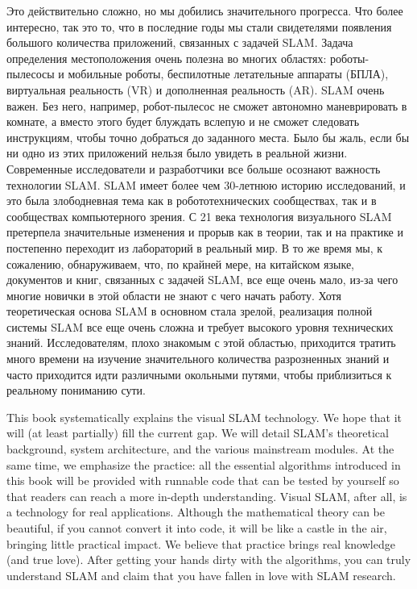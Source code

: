 \begin{Russian}
    Это действительно сложно, но мы добились значительного прогресса. Что более интересно, так это то, что в последние годы мы стали свидетелями появления большого количества приложений, связанных с задачей SLAM. Задача определения местоположения очень полезна во многих областях: роботы-пылесосы и мобильные роботы, беспилотные летательные аппараты (БПЛА), виртуальная реальность (VR) и дополненная реальность (AR). SLAM очень важен. Без него, например, робот-пылесос не сможет автономно маневрировать в комнате, а вместо этого будет блуждать вслепую и не сможет следовать инструкциям, чтобы точно добраться до заданного места. Было бы жаль, если бы ни одно из этих приложений нельзя было увидеть в реальной жизни.
    Современные исследователи и разработчики все больше осознают важность технологии SLAM. SLAM имеет более чем 30-летнюю историю исследований, и это была злободневная тема как в робототехнических сообществах, так и в сообществах компьютерного зрения. С 21 века технология визуального SLAM претерпела значительные изменения и прорыв как в теории, так и на практике и постепенно переходит из лабораторий в реальный мир. В то же время мы, к сожалению, обнаруживаем, что, по крайней мере, на китайском языке, документов и книг, связанных с задачей SLAM, все еще очень мало, из-за чего многие новички в этой области не знают с чего начать работу. Хотя теоретическая основа SLAM в основном стала зрелой, реализация полной системы SLAM все еще очень сложна и требует высокого уровня технических знаний. Исследователям, плохо знакомым с этой областью, приходится тратить много времени на изучение значительного количества разрозненных знаний и часто приходится идти различными окольными путями, чтобы приблизиться к реальному пониманию сути.    
\end{Russian}

\begin{English}
    This book systematically explains the visual SLAM technology. We hope that it will (at least partially) fill the current gap. We will detail SLAM's theoretical background, system architecture, and the various mainstream modules. At the same time, we emphasize the practice: all the essential algorithms introduced in this book will be provided with runnable code that can be tested by yourself so that readers can reach a more in-depth understanding. Visual SLAM, after all, is a technology for real applications. Although the mathematical theory can be beautiful, if you cannot convert it into code, it will be like a castle in the air, bringing little practical impact. We believe that practice brings real knowledge (and true love). After getting your hands dirty with the algorithms, you can truly understand SLAM and claim that you have fallen in love with SLAM research.
\end{English}

